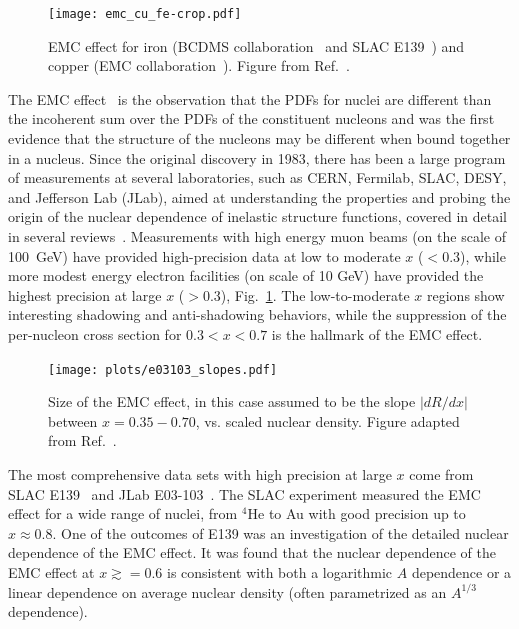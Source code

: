 \begin{figure}[tbp]
\centering\texttt{[image: emc\_cu\_fe-crop.pdf]}
\caption{EMC effect for iron (BCDMS collaboration~\cite{Benvenuti:1987az} and SLAC E139~\cite{Gomez:1993ri}) and copper (EMC collaboration~\cite{Ashman:1992kv}).
Figure from Ref.~\cite{Guzey:2012yk}.}
\label{fig:emc_iron}
\end{figure}

The EMC effect~\cite{Aubert:1983xm} is the observation that the PDFs for nuclei are different than
the incoherent sum over the PDFs of the constituent nucleons and was the first evidence that 
the structure of the nucleons may be different when bound together in a nucleus.
Since the original discovery in 1983, there has been a large
program of measurements at several laboratories, such as CERN, Fermilab, SLAC, DESY, and Jefferson Lab (JLab),
aimed at understanding the properties and probing the origin of the nuclear dependence of inelastic
structure functions, covered in detail in several reviews~\cite{Arneodo:1992wf,Geesaman:1995yd,Sargsian:2002wc,Malace:2014uea, Hen:2016kwk}.
Measurements with high energy muon beams (on the scale of 100~GeV) have provided high-precision data at low to
moderate $x$ ($<0.3$), while more modest energy electron facilities (on scale of 10 GeV) have provided
the highest precision at large $x$ ($>0.3$), Fig.~\ref{fig:emc_iron}.  The low-to-moderate $x$
regions show interesting shadowing and anti-shadowing behaviors, while the suppression of the
per-nucleon cross section for $0.3<x<0.7$ is the hallmark of the EMC effect.

\begin{figure}[tbp]
\centering\texttt{[image: plots/e03103\_slopes.pdf]}
\caption{Size of the EMC effect, in this case assumed to be the slope $|dR/dx|$ between $x=0.35-0.70$, vs. scaled nuclear density. Figure adapted from Ref.~\cite{Seely:2009gt}.}
\label{fig:emc_jlab_hallc}
\end{figure}

The most comprehensive data sets with high precision at large $x$ come from SLAC E139~\cite{Gomez:1993ri} and JLab E03-103~\cite{Seely:2009gt}. The SLAC experiment
measured the EMC effect for a wide range of nuclei, from $^4$He to Au with good precision up to
$x\approx0.8$.  One of the outcomes of E139 was an investigation of the detailed nuclear dependence of the EMC
effect. It was found that the nuclear dependence of the EMC effect at $x \gtrsim =0.6$ is consistent
with both a logarithmic $A$ dependence or a linear dependence on average nuclear density (often parametrized as an $A^{1/3}$ dependence).

